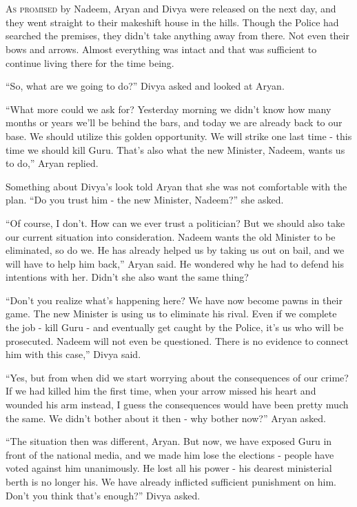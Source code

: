 \chapter{}

\lettrine{A}{s promised} by Nadeem, Aryan and Divya were released on the next
day, and they
went straight to their makeshift house in the hills. Though the Police had
searched the premises, they didn't take anything away from there. Not even their
bows and arrows. Almost everything was intact and that was sufficient to
continue living there for the time being.

“So, what are we going to do?” Divya asked and looked at Aryan.

“What more could we ask for? Yesterday morning we didn't know how many months or
years we'll be behind the bars, and today we are already back to our base. We
should utilize this golden opportunity. We will strike one last time - this time
we should kill Guru. That's also what the new Minister, Nadeem, wants us to do,”
Aryan replied.

Something about Divya's look told Aryan that she was not comfortable with the
plan. “Do you trust him - the new Minister, Nadeem?” she asked.

“Of course, I don't. How can we ever trust a politician? But we should also take
our current situation into consideration. Nadeem wants the old Minister to be
eliminated, so do we. He has already helped us by taking us out on bail, and we
will have to help him back,” Aryan said. He wondered why he had to defend his
intentions with her. Didn't she also want the same thing?

“Don't you realize what's happening here? We have now become pawns in their
game. The new Minister is using us to eliminate his rival. Even if we complete
the job - kill Guru - and eventually get caught by the Police, it's us who will
be prosecuted. Nadeem will not even be questioned. There is no evidence to
connect him with this case,” Divya said.

“Yes, but from when did we start worrying about the consequences of our crime?
If we had killed him the first time, when your arrow missed his heart and
wounded his arm instead, I guess the consequences would have been pretty much
the same. We didn't bother about it then - why bother now?” Aryan asked.

“The situation then was different, Aryan. But now, we have exposed Guru in front
of the national media, and we made him lose the elections - people have voted
against him unanimously. He lost all his power - his dearest ministerial berth
is no longer his. We have already inflicted sufficient punishment on him. Don't
you think that's enough?” Divya asked.

